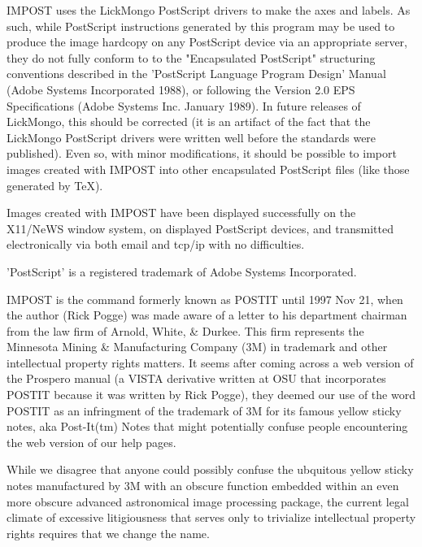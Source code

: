 
IMPOST uses the LickMongo PostScript drivers to make the axes and labels.
As such, while PostScript instructions generated by this program may be
used to produce the image hardcopy on any PostScript device via an
appropriate server, they do not fully conform to to the "Encapsulated
PostScript" structuring conventions described in the 'PostScript Language
Program Design' Manual (Adobe Systems Incorporated 1988), or following the
Version 2.0 EPS Specifications (Adobe Systems Inc. January 1989).  In
future releases of LickMongo, this should be corrected (it is an artifact
of the fact that the LickMongo PostScript drivers were written well before
the standards were published).  Even so, with minor modifications, it
should be possible to import images created with IMPOST into other
encapsulated PostScript files (like those generated by TeX).

Images created with IMPOST have been displayed successfully on the X11/NeWS
window system, on displayed PostScript devices, and transmitted
electronically via both email and tcp/ip with no difficulties.

'PostScript' is a registered trademark of Adobe Systems Incorporated.


IMPOST is the command formerly known as POSTIT until 1997 Nov 21, when the
author (Rick Pogge) was made aware of a letter to his department chairman
from the law firm of Arnold, White, \& Durkee.  This firm represents the
Minnesota Mining \& Manufacturing Company (3M) in trademark and other
intellectual property rights matters.  It seems after coming across a web
version of the Prospero manual (a VISTA derivative written at OSU that
incorporates POSTIT because it was written by Rick Pogge), they deemed our
use of the word POSTIT as an infringment of the trademark of 3M for its
famous yellow sticky notes, aka Post-It(tm) Notes that might potentially
confuse people encountering the web version of our help pages.

While we disagree that anyone could possibly confuse the ubquitous yellow
sticky notes manufactured by 3M with an obscure function embedded within an
even more obscure advanced astronomical image processing package, the
current legal climate of excessive litigiousness that serves only to
trivialize intellectual property rights requires that we change the name.

